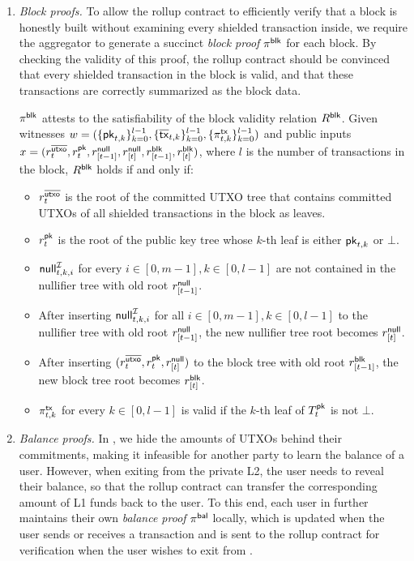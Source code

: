 \begin{enumerate}
    \item \textit{Block proofs.}
    To allow the rollup contract to efficiently verify that a block is honestly built without examining every shielded transaction inside, we require the aggregator to generate a succinct \textit{block proof} $\pi^\mathsf{blk}$ for each block.
    By checking the validity of this proof, the rollup contract should be convinced that every shielded transaction in the block is valid, and that these transactions are correctly summarized as the block data.

    $\pi^\mathsf{blk}$ attests to the satisfiability of the block validity relation $R^\mathsf{blk}$.
    Given witnesses $w = (\{{\mathsf{pk}}_{t, k}\}^{l - 1}_{k = 0}, \{\overline{\mathsf{tx}}_{t, k}\}^{l - 1}_{k = 0}, \{\pi^\mathsf{tx}_{t, k}\}^{l - 1}_{k = 0})$ and public inputs $x = (r^{\overline{\mathsf{utxo}}}_t, r^{\mathsf{pk}}_t, r^\mathsf{null}_{[t - 1]}, r^\mathsf{null}_{[t]}, r^\mathsf{blk}_{[t - 1]}, r^\mathsf{blk}_{[t]})$, where $l$ is the number of transactions in the block, $R^\mathsf{blk}$ holds if and only if:
    \begin{itemize}
        \item $r^{\overline{\mathsf{utxo}}}_t$ is the root of the committed \ac{UTXO} tree that contains committed \acp{UTXO} of all shielded transactions in the block as leaves.
        \item $r^{\mathsf{pk}}_t$ is the root of the public key tree whose $k$-th leaf is either ${\mathsf{pk}}_{t, k}$ or $\bot$.
        \item $\mathsf{null}^\mathcal{I}_{t, k, i}$ for every $i \in [0, m - 1], k \in [0, l - 1]$ are not contained in the nullifier tree with old root $r^\mathsf{null}_{[t - 1]}$.
        \item After inserting $\mathsf{null}^\mathcal{I}_{t, k, i}$ for all $i \in [0, m - 1], k \in [0, l - 1]$ to the nullifier tree with old root $r^\mathsf{null}_{[t - 1]}$, the new nullifier tree root becomes $r^\mathsf{null}_{[t]}$.
        \item After inserting $(r^{\overline{\mathsf{utxo}}}_t, r^{\mathsf{pk}}_t, r^\mathsf{null}_{[t]})$ to the block tree with old root $r^\mathsf{blk}_{[t - 1]}$, the new block tree root becomes $r^\mathsf{blk}_{[t]}$.
        \item $\pi^\mathsf{tx}_{t, k}$ for every $k \in [0, l - 1]$ is valid if the $k$-th leaf of $T^{\mathsf{pk}}_t$ is not $\bot$.
    \end{itemize}

    \item \textit{Balance proofs.}
    In \Protocol, we hide the amounts of \acp{UTXO} behind their commitments, making it infeasible for another party to learn the balance of a user.
    However, when exiting from the private \ac{L2}, the user needs to reveal their balance, so that the rollup contract can transfer the corresponding amount of \ac{L1} funds back to the user.
    To this end, each user in \Protocol further maintains their own \textit{balance proof} $\pi^\mathsf{bal}$ locally, which is updated when the user sends or receives a transaction and is sent to the rollup contract for verification when the user wishes to exit from \Protocol.


\end{enumerate}
